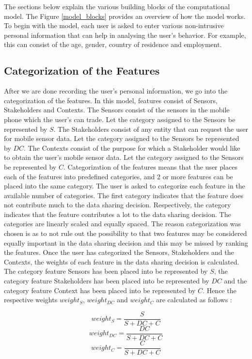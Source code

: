 The sections below explain the various building blocks of the computational model. The Figure \ref{model_blocks}
provides an overview of how the model works.
To begin with the model, each user is asked to enter various non-intrusive personal information that can help in analysing
the user's behavior. For example, this can consist of the age, gender, country of residence and employment.

\subsection{Categorization of the Features} \label{catfeatures}
After we are  done recording the user's personal information, we go into the categorization of the features.
In this model, features consist of Sensors, Stakeholders and Contexts. The Sensors consist of the sensors in the mobile phone which the user's
can trade. Let the category assigned to the Sensors be represented by $S$. The Stakeholders
consist of any entity that can request the user for mobile sensor data. Let the category assigned to the Sensors be represented by $DC$. The Contexts consist of the purpose for which a Stakeholder would like to obtain the user's mobile sensor data. Let the category assigned to the Sensors be represented by $C$. 
Categorization of the features means that the user places each of the features into predefined categories, and 2 or more features can
be placed into the same category. 
The user is asked to categorize each feature in the available \numcategories number of categories.
The first category indicates that the feature does not contribute much to the data sharing decision. Respectively, the category \numcategories indicates that
the feature contributes a lot to the data sharing decision. The categories are linearly scaled and equally spaced. The reason categorization was chosen is as to not rule out the possibility to that two features may be considered equally important in the data sharing decision and this may be missed by ranking the features.
Once the user has categorized the Sensors, Stakeholders and the Contexts, the weights of each feature in the data sharing decision is calculated.
The category feature Sensors has been placed into be represented by $S$, the category feature Stakeholders has been placed into be represented by $DC$ and the category feature Context has been placed into be represented by $C$. Hence the respective weights $weight_S$, $weight_{DC}$ and $weight_C$ are calculated as follows :

\begin{equation}
   weight_S = \frac{S}{S+DC+C} 
\end{equation}
\begin{equation}
   weight_{DC} = \frac{DC}{S+DC+C} 
\end{equation}
\begin{equation}
   weight_C = \frac{C}{S+DC+C} 
\end{equation}


